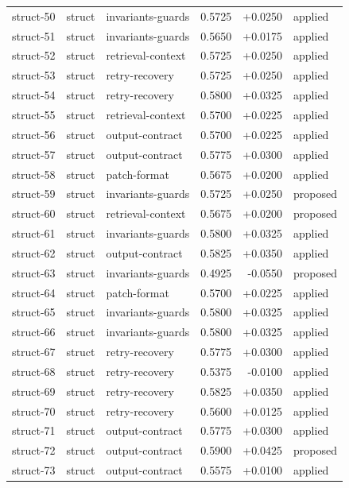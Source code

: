\begin{center}
\begin{longtable}{llp{5.2cm}rrl}
struct-50 & struct & invariants-guards & 0.5725 & +0.0250 & applied \\
struct-51 & struct & invariants-guards & 0.5650 & +0.0175 & applied \\
struct-52 & struct & retrieval-context & 0.5725 & +0.0250 & applied \\
struct-53 & struct & retry-recovery & 0.5725 & +0.0250 & applied \\
struct-54 & struct & retry-recovery & 0.5800 & +0.0325 & applied \\
struct-55 & struct & retrieval-context & 0.5700 & +0.0225 & applied \\
struct-56 & struct & output-contract & 0.5700 & +0.0225 & applied \\
struct-57 & struct & output-contract & 0.5775 & +0.0300 & applied \\
struct-58 & struct & patch-format & 0.5675 & +0.0200 & applied \\
struct-59 & struct & invariants-guards & 0.5725 & +0.0250 & proposed \\
struct-60 & struct & retrieval-context & 0.5675 & +0.0200 & proposed \\
struct-61 & struct & invariants-guards & 0.5800 & +0.0325 & applied \\
struct-62 & struct & output-contract & 0.5825 & +0.0350 & applied \\
struct-63 & struct & invariants-guards & 0.4925 & -0.0550 & proposed \\
struct-64 & struct & patch-format & 0.5700 & +0.0225 & applied \\
struct-65 & struct & invariants-guards & 0.5800 & +0.0325 & applied \\
struct-66 & struct & invariants-guards & 0.5800 & +0.0325 & applied \\
struct-67 & struct & retry-recovery & 0.5775 & +0.0300 & applied \\
struct-68 & struct & retry-recovery & 0.5375 & -0.0100 & applied \\
struct-69 & struct & retry-recovery & 0.5825 & +0.0350 & applied \\
struct-70 & struct & retry-recovery & 0.5600 & +0.0125 & applied \\
struct-71 & struct & output-contract & 0.5775 & +0.0300 & applied \\
struct-72 & struct & output-contract & 0.5900 & +0.0425 & proposed \\
struct-73 & struct & output-contract & 0.5575 & +0.0100 & applied \\

\end{longtable}
\end{center}
